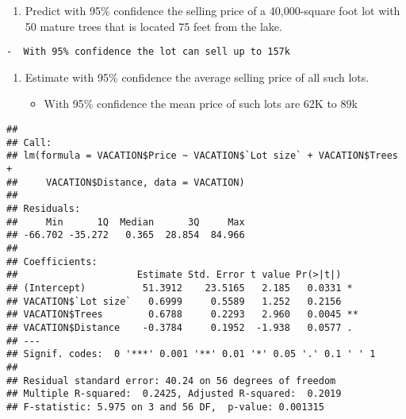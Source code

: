 \documentclass[]{article}
\newenvironment{Shaded}{\begin{snugshade}}{\end{snugshade}}
\newcommand{\DataTypeTok}[1]{\textcolor[rgb]{0.13,0.29,0.53}{#1}}
\newcommand{\KeywordTok}[1]{\textcolor[rgb]{0.13,0.29,0.53}{\textbf{#1}}}
\newcommand{\NormalTok}[1]{#1}
\newcommand{\OperatorTok}[1]{\textcolor[rgb]{0.81,0.36,0.00}{\textbf{#1}}}
\newcommand{\StringTok}[1]{\textcolor[rgb]{0.31,0.60,0.02}{#1}}
\providecommand{\tightlist}{%
  \setlength{\itemsep}{0pt}\setlength{\parskip}{0pt}}
\begin{document}
\begin{enumerate}
\def\labelenumi{\alph{enumi}.}
\setcounter{enumi}{5}
\tightlist
\item
  Predict with 95\% confidence the selling price of a 40,000-square foot
  lot with 50 mature trees that is located 75 feet from the lake.
\end{enumerate}

\begin{verbatim}
-  With 95% confidence the lot can sell up to 157k
\end{verbatim}

\begin{enumerate}
\def\labelenumi{\alph{enumi}.}
\setcounter{enumi}{6}
\item
  Estimate with 95\% confidence the average selling price of all such
  lots.

  \begin{itemize}
  \tightlist
  \item
    With 95\% confidence the mean price of such lots are 62K to 89k
  \end{itemize}
\end{enumerate}

\begin{Shaded}
\end{Shaded}

\begin{verbatim}
## 
## Call:
## lm(formula = VACATION$Price ~ VACATION$`Lot size` + VACATION$Trees + 
##     VACATION$Distance, data = VACATION)
## 
## Residuals:
##     Min      1Q  Median      3Q     Max 
## -66.702 -35.272   0.365  28.854  84.966 
## 
## Coefficients:
##                     Estimate Std. Error t value Pr(>|t|)   
## (Intercept)          51.3912    23.5165   2.185   0.0331 * 
## VACATION$`Lot size`   0.6999     0.5589   1.252   0.2156   
## VACATION$Trees        0.6788     0.2293   2.960   0.0045 **
## VACATION$Distance    -0.3784     0.1952  -1.938   0.0577 . 
## ---
## Signif. codes:  0 '***' 0.001 '**' 0.01 '*' 0.05 '.' 0.1 ' ' 1
## 
## Residual standard error: 40.24 on 56 degrees of freedom
## Multiple R-squared:  0.2425, Adjusted R-squared:  0.2019 
## F-statistic: 5.975 on 3 and 56 DF,  p-value: 0.001315
\end{verbatim}
\end{document}
